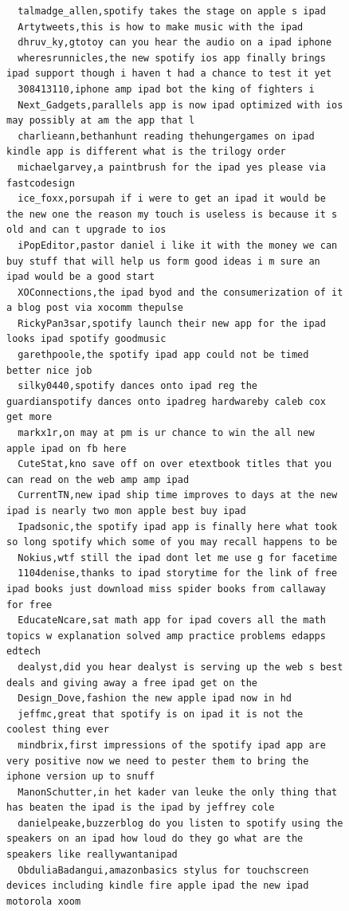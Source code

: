\begin{figure}[htpb]
\begin{verbatim}
  talmadge_allen,spotify takes the stage on apple s ipad
  Artytweets,this is how to make music with the ipad
  dhruv_ky,gtotoy can you hear the audio on a ipad iphone
  wheresrunnicles,the new spotify ios app finally brings ipad support though i haven t had a chance to test it yet
  308413110,iphone amp ipad bot the king of fighters i
  Next_Gadgets,parallels app is now ipad optimized with ios may possibly at am the app that l
  charlieann,bethanhunt reading thehungergames on ipad kindle app is different what is the trilogy order
  michaelgarvey,a paintbrush for the ipad yes please via fastcodesign
  ice_foxx,porsupah if i were to get an ipad it would be the new one the reason my touch is useless is because it s old and can t upgrade to ios
  iPopEditor,pastor daniel i like it with the money we can buy stuff that will help us form good ideas i m sure an ipad would be a good start
  XOConnections,the ipad byod and the consumerization of it a blog post via xocomm thepulse
  RickyPan3sar,spotify launch their new app for the ipad looks ipad spotify goodmusic
  garethpoole,the spotify ipad app could not be timed better nice job
  silky0440,spotify dances onto ipad reg the guardianspotify dances onto ipadreg hardwareby caleb cox get more
  markx1r,on may at pm is ur chance to win the all new apple ipad on fb here
  CuteStat,kno save off on over etextbook titles that you can read on the web amp amp ipad
  CurrentTN,new ipad ship time improves to days at the new ipad is nearly two mon apple best buy ipad
  Ipadsonic,the spotify ipad app is finally here what took so long spotify which some of you may recall happens to be
  Nokius,wtf still the ipad dont let me use g for facetime
  1104denise,thanks to ipad storytime for the link of free ipad books just download miss spider books from callaway for free
  EducateNcare,sat math app for ipad covers all the math topics w explanation solved amp practice problems edapps edtech
  dealyst,did you hear dealyst is serving up the web s best deals and giving away a free ipad get on the
  Design_Dove,fashion the new apple ipad now in hd
  jeffmc,great that spotify is on ipad it is not the coolest thing ever
  mindbrix,first impressions of the spotify ipad app are very positive now we need to pester them to bring the iphone version up to snuff
  ManonSchutter,in het kader van leuke the only thing that has beaten the ipad is the ipad by jeffrey cole
  danielpeake,buzzerblog do you listen to spotify using the speakers on an ipad how loud do they go what are the speakers like reallywantanipad
  ObduliaBadangui,amazonbasics stylus for touchscreen devices including kindle fire apple ipad the new ipad motorola xoom

\end{verbatim}
\end{figure}
